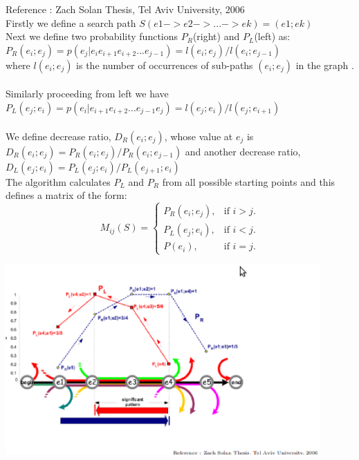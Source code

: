 \documentclass{article}
\begin{document}
\hfill {\scriptsize Reference : Zach Solan Thesis, Tel Aviv University, 2006}
\\
Firstly we define a search path $S(e1 -> e2 -> ... -> ek ) = (e1 ; ek )$
\\Next we define two probability functions $P_R$(right) and $P_L$(left) as:
\\
$P_R (e_i;e_j ) = p(e_j |e_i e_{i+1} e_{i+2} ...e_{j−1} ) = l(e_{i} ; e_{j} ) / l(e_{i} ; e_{j−1} )$
\\
where $l(e_i ; e_j )$ is the number of occurrences of sub-paths $(e_i ; e_j )$ in the graph .
\\
\\Similarly proceeding from left we have
\\
$P_L (e_j ; e_i ) = p(e_i |e_{i+1} e_{i+2} ...e_{j−1} e_j ) = l(e_j ; e_i )/ l(e_j ; e_{i+1} )$
\\ \\
We define decrease ratio, $D_R (e_i ; e_j )$, whose value at $e_j$ is $D_R (e_i ; e_j ) = P_R (e_i ; e_j )/P_R (e_i ; e_{j−1} )$
and another decrease ratio, $D_L (e_j ; e_i ) = P_L (e_j ; e_i )/P_L (e_{j+1} ; e_i )$
\\
The algorithm calculates $P_L$ and $P_R$ from all possible starting points and this defines a matrix of the form:
\\
\begin{equation}
  M_{ij}(S)=\begin{cases}
    P_R(e_i;e_j), & \text{if $i>j$}.\\
    P_L(e_j;e_i), & \text{if $i<j$}.\\
    P(e_i), & \text{if $i=j$}.
  \end{cases}
\end{equation}
\begin{center}\includegraphics[width=12cm]{pattern.eps}\end{center}
\end{document}
